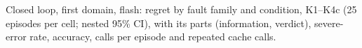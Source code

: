 \begin{table}[!htbp]
\centering
\caption{Closed loop, first domain, flash: regret by fault family and condition, K1--K4c (25 episodes per cell; nested 95\% CI), with its parts (information, verdict), severe-error rate, accuracy, calls per episode and repeated cache calls.}
\label{tab:agent-llm-flash}
\scriptsize
\setlength{\tabcolsep}{3pt}
\resizebox{\linewidth}{!}{}
\end{table}
